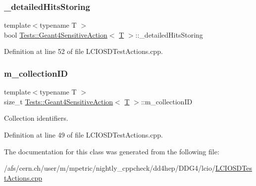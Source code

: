 \subsubsection{\texorpdfstring{\+\_\+detailed\+Hits\+Storing}{\_detailedHitsStoring}}
{\footnotesize\ttfamily template$<$typename T $>$ \\
bool \hyperlink{class_tests_1_1_geant4_sensitive_action}{Tests\+::\+Geant4\+Sensitive\+Action}$<$ \hyperlink{class_t}{T} $>$\+::\+\_\+detailed\+Hits\+Storing\hspace{0.3cm}{\ttfamily [protected]}}



Definition at line 52 of file L\+C\+I\+O\+S\+D\+Test\+Actions.\+cpp.

\hypertarget{class_tests_1_1_geant4_sensitive_action_a44a9e95251d84b3da5f5115530f9cde8}{}\label{class_tests_1_1_geant4_sensitive_action_a44a9e95251d84b3da5f5115530f9cde8} 
\subsubsection{\texorpdfstring{m\+\_\+collection\+ID}{m\_collectionID}}
{\footnotesize\ttfamily template$<$typename T $>$ \\
size\+\_\+t \hyperlink{class_tests_1_1_geant4_sensitive_action}{Tests\+::\+Geant4\+Sensitive\+Action}$<$ \hyperlink{class_t}{T} $>$\+::m\+\_\+collection\+ID\hspace{0.3cm}{\ttfamily [protected]}}



Collection identifiers. 



Definition at line 49 of file L\+C\+I\+O\+S\+D\+Test\+Actions.\+cpp.



The documentation for this class was generated from the following file\+:\begin{DoxyCompactItemize}
\item 
/afs/cern.\+ch/user/m/mpetric/nightly\+\_\+cppcheck/dd4hep/\+D\+D\+G4/lcio/\hyperlink{_l_c_i_o_s_d_test_actions_8cpp}{L\+C\+I\+O\+S\+D\+Test\+Actions.\+cpp}\end{DoxyCompactItemize}
